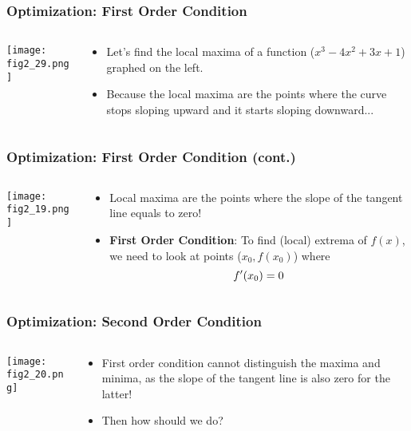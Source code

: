 \documentclass[pdflatex, 12pt]{beamer}
\begin{document}
\begin{frame}
\frametitle{Optimization: First Order Condition}
\begin{columns}
\begin{column}{0.5\textwidth}
\texttt{[image: fig2\_29.png]}
\end{column}
\begin{column}{0.5\textwidth}
\begin{itemize}
\item Let's find the local maxima of a function ($x^3 - 4x^2 + 3x + 1$) graphed on the left.
\vspace{0.4cm}
\item Because the local maxima are the points where the curve stops sloping upward and it starts sloping downward...
\end{itemize}
\end{column}
\end{columns}
\end{frame}

\begin{frame}
\frametitle{Optimization: First Order Condition (cont.)}
\begin{columns}
\begin{column}{0.5\textwidth}
\texttt{[image: fig2\_19.png]}
\end{column}
\begin{column}{0.5\textwidth}
\begin{itemize}
\item Local maxima are the points where the slope of the tangent line equals to zero!
\vspace{0.4cm}
\item \textbf{First Order Condition}: To find (local) extrema of $f(x)$, we need to look at points ($x_0, f(x_0)$) where
 \begin{equation}
 f'(x_0) = 0 \notag
 \end{equation}
\end{itemize}
\end{column}
\end{columns}
\end{frame}

\begin{frame}
\frametitle{Optimization: Second Order Condition}
\begin{columns}
\begin{column}{0.5\textwidth}
\texttt{[image: fig2\_20.png]}
\end{column}
\begin{column}{0.5\textwidth}
\begin{itemize}
\item First order condition cannot distinguish the maxima and minima, as the slope of the tangent line is also zero for the latter!
\vspace{0.4cm}
\item Then how should we do?
\end{itemize}
\end{column}
\end{columns}
\end{frame}
\end{document}
